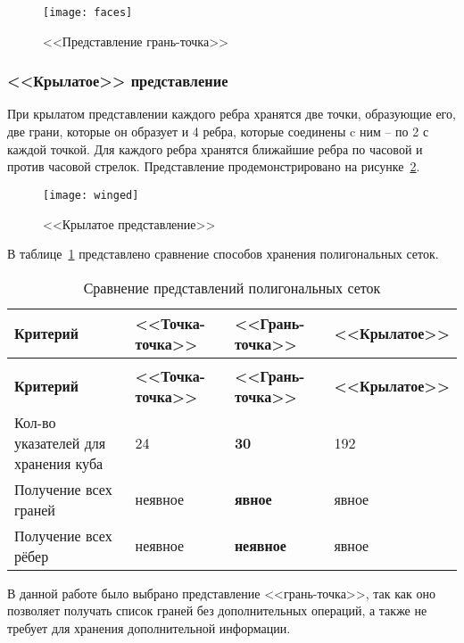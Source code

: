 \begin{figure}[H]
	\centering
	\texttt{[image: faces]}
	\caption{<<Представление грань-точка>>}
	\label{fig:vertex-face}
\end{figure}

\subsubsection{<<Крылатое>> представление}
При крылатом представлении каждого ребра хранятся две точки, образующие его, две грани, которые он образует и 4 ребра, которые соединены c ним -- по 2 с каждой точкой. Для каждого ребра хранятся ближайшие ребра по часовой и против часовой стрелок.
Представление продемонстрировано на рисунке~\ref{fig:winged}.

\begin{figure}[H]
	\centering
	\texttt{[image: winged]}
	\caption{<<Крылатое представление>>}
	\label{fig:winged}
\end{figure}

В таблице~\ref{tbl:mesh-structs} представлено сравнение способов хранения полигональных сеток.

\begin{longtable}{|p{}|p{}|p{}|p{}|}
	\caption{Сравнение представлений полигональных сеток} \label{tbl:mesh-structs} 
	\\
	\hline
	\textbf{Критерий} & \textbf{<<Точка-точка>>} & \textbf{<<Грань-точка>>} & \textbf{<<Крылатое>>} \\
	\hline
	\endfirsthead
	\caption{Сравнение представлений полигональных сеток}
	\\
	\hline
	\textbf{Критерий} & \textbf{<<Точка-точка>>} & \textbf{<<Грань-точка>>} & \textbf{<<Крылатое>>} \\
	\hline
	\endhead
	\hline
	\endfoot
	\endlastfoot
	Кол-во указателей для хранения куба\cite{colins} & 24 & \textbf{30} & 192 \\
	\hline
	Получение всех граней & неявное & \textbf{явное} & явное \\
	\hline
	Получение всех рёбер & неявное & \textbf{неявное} & явное \\
	\hline
\end{longtable}

В данной работе было выбрано представление <<грань-точка>>, так как оно позволяет получать список граней без дополнительных операций, а также не требует для хранения дополнительной информации.

